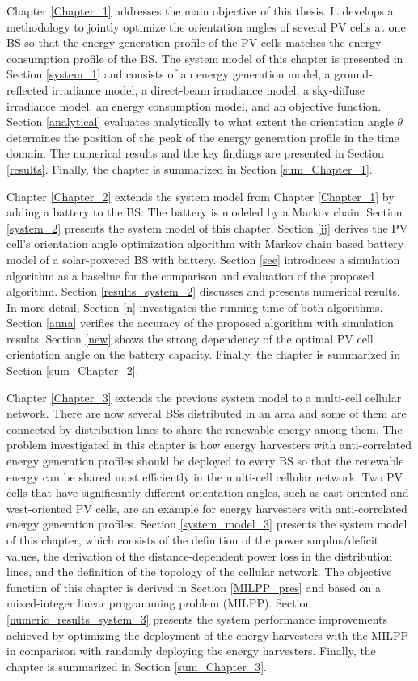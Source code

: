 Chapter \ref{Chapter_1} addresses the main objective of this thesis. It develops a methodology to jointly optimize the orientation angles of several PV cells at one BS so that the energy generation profile of the PV cells matches the energy consumption profile of the BS. The system model of this chapter is presented in Section \ref{system_1} and consists of an energy generation model, a ground-reflected irradiance model, a direct-beam irradiance model, a sky-diffuse irradiance model, an energy consumption model, and an objective function. Section \ref{analytical} evaluates analytically to what extent the orientation angle $\theta$ determines the position of the peak of the energy generation profile in the time domain. The numerical results and the key findings are presented in Section \ref{results}. Finally, the chapter is summarized in Section \ref{sum_Chapter_1}.



Chapter \ref{Chapter_2} extends the system model from Chapter \ref{Chapter_1} by adding a battery to the BS. The battery is modeled by a Markov chain. Section \ref{system_2} presents the system model of this chapter. Section \ref{jj} derives the PV cell's orientation angle optimization algorithm with Markov chain based battery model of a solar-powered BS with battery. Section \ref{see} introduces a simulation algorithm as a baseline for the comparison and evaluation of the proposed algorithm. Section \ref{results_system_2} discusses and presents numerical results. In more detail, Section \ref{n} investigates the running time of both algorithms. Section \ref{anna} verifies the accuracy of the proposed algorithm with simulation results.
Section \ref{new} shows the strong dependency of the optimal PV cell orientation angle on the battery capacity. Finally, the chapter is summarized in Section \ref{sum_Chapter_2}. 

Chapter \ref{Chapter_3} extends the previous system model to a multi-cell cellular network. There are now several BSs distributed in an area and some of them are connected by distribution lines to share the renewable energy among them. The problem investigated in this chapter is how energy harvesters with anti-correlated energy generation profiles should be deployed to every BS so that the renewable energy can be shared most efficiently in the multi-cell cellular network. Two PV cells that have significantly different orientation angles, such as east-oriented and west-oriented PV cells, are an example for energy harvesters with anti-correlated energy generation profiles. Section \ref{system_model_3} presents the system model of this chapter, which consists of the definition of the power surplus/deficit values, the derivation of the distance-dependent power loss in the distribution lines, and the definition of the topology of the cellular network. The objective function of this chapter is derived in Section \ref{MILPP_pres} and based on a mixed-integer linear programming problem (MILPP). Section \ref{numeric_results_system_3} presents the system performance improvements achieved by optimizing the deployment of the energy-harvesters with the MILPP in comparison with randomly deploying the energy harvesters. Finally, the chapter is summarized in Section \ref{sum_Chapter_3}.
 
